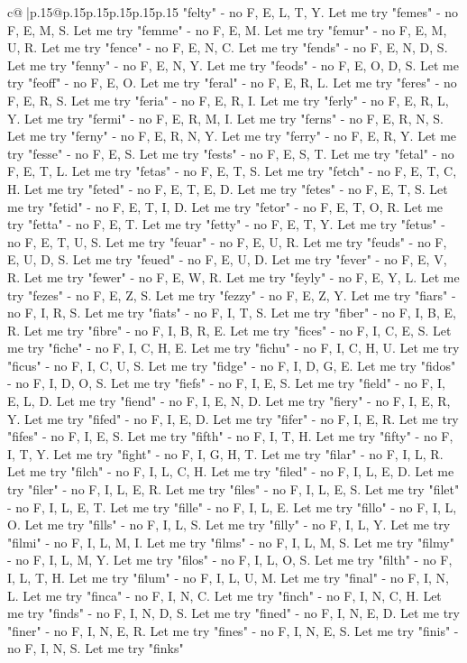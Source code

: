 \documentclass{article}
\begin{document}
{\begin{supertabular}{c@{$\;$}|p{.15\linewidth}@{}p{.15\linewidth}p{.15\linewidth}p{.15\linewidth}p{.15\linewidth}p{.15\linewidth}}
{{{"felty" {-} no F, E, L, T, Y. Let me try "femes" {-} no F, E, M, S. Let me try "femme" {-} no F, E, M. Let me try "femur" {-} no F, E, M, U, R. Let me try "fence" {-} no F, E, N, C. Let me try "fends" {-} no F, E, N, D, S. Let me try "fenny" {-} no F, E, N, Y. Let me try "feods" {-} no F, E, O, D, S. Let me try "feoff" {-} no F, E, O. Let me try "feral" {-} no F, E, R, L. Let me try "feres" {-} no F, E, R, S. Let me try "feria" {-} no F, E, R, I. Let me try "ferly" {-} no F, E, R, L, Y. Let me try "fermi" {-} no F, E, R, M, I. Let me try "ferns" {-} no F, E, R, N, S. Let me try "ferny" {-} no F, E, R, N, Y. Let me try "ferry" {-} no F, E, R, Y. Let me try "fesse" {-} no F, E, S. Let me try "fests" {-} no F, E, S, T. Let me try "fetal" {-} no F, E, T, L. Let me try "fetas" {-} no F, E, T, S. Let me try "fetch" {-} no F, E, T, C, H. Let me try "feted" {-} no F, E, T, E, D. Let me try "fetes" {-} no F, E, T, S. Let me try "fetid" {-} no F, E, T, I, D. Let me try "fetor" {-} no F, E, T, O, R. Let me try "fetta" {-} no F, E, T. Let me try "fetty" {-} no F, E, T, Y. Let me try "fetus" {-} no F, E, T, U, S. Let me try "feuar" {-} no F, E, U, R. Let me try "feuds" {-} no F, E, U, D, S. Let me try "feued" {-} no F, E, U, D. Let me try "fever" {-} no F, E, V, R. Let me try "fewer" {-} no F, E, W, R. Let me try "feyly" {-} no F, E, Y, L. Let me try "fezes" {-} no F, E, Z, S. Let me try "fezzy" {-} no F, E, Z, Y. Let me try "fiars" {-} no F, I, R, S. Let me try "fiats" {-} no F, I, T, S. Let me try "fiber" {-} no F, I, B, E, R. Let me try "fibre" {-} no F, I, B, R, E. Let me try "fices" {-} no F, I, C, E, S. Let me try "fiche" {-} no F, I, C, H, E. Let me try "fichu" {-} no F, I, C, H, U. Let me try "ficus" {-} no F, I, C, U, S. Let me try "fidge" {-} no F, I, D, G, E. Let me try "fidos" {-} no F, I, D, O, S. Let me try "fiefs" {-} no F, I, E, S. Let me try "field" {-} no F, I, E, L, D. Let me try "fiend" {-} no F, I, E, N, D. Let me try "fiery" {-} no F, I, E, R, Y. Let me try "fifed" {-} no F, I, E, D. Let me try "fifer" {-} no F, I, E, R. Let me try "fifes" {-} no F, I, E, S. Let me try "fifth" {-} no F, I, T, H. Let me try "fifty" {-} no F, I, T, Y. Let me try "fight" {-} no F, I, G, H, T. Let me try "filar" {-} no F, I, L, R. Let me try "filch" {-} no F, I, L, C, H. Let me try "filed" {-} no F, I, L, E, D. Let me try "filer" {-} no F, I, L, E, R. Let me try "files" {-} no F, I, L, E, S. Let me try "filet" {-} no F, I, L, E, T. Let me try "fille" {-} no F, I, L, E. Let me try "fillo" {-} no F, I, L, O. Let me try "fills" {-} no F, I, L, S. Let me try "filly" {-} no F, I, L, Y. Let me try "filmi" {-} no F, I, L, M, I. Let me try "films" {-} no F, I, L, M, S. Let me try "filmy" {-} no F, I, L, M, Y. Let me try "filos" {-} no F, I, L, O, S. Let me try "filth" {-} no F, I, L, T, H. Let me try "filum" {-} no F, I, L, U, M. Let me try "final" {-} no F, I, N, L. Let me try "finca" {-} no F, I, N, C. Let me try "finch" {-} no F, I, N, C, H. Let me try "finds" {-} no F, I, N, D, S. Let me try "fined" {-} no F, I, N, E, D. Let me try "finer" {-} no F, I, N, E, R. Let me try "fines" {-} no F, I, N, E, S. Let me try "finis" {-} no F, I, N, S. Let me try "finks" }}}
\end{supertabular}}
\end{document}
